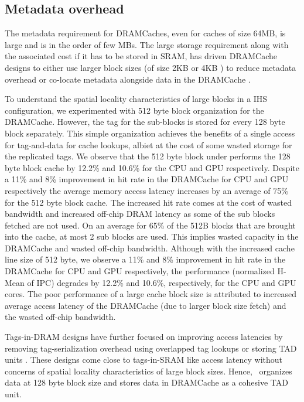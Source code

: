 \subsection{Metadata overhead} 
The metadata requirement for DRAMCaches, even for caches of size 64MB, is large and is in the order of few MBs. The large storage requirement along with the associated cost if it has to be stored in SRAM, has driven DRAMCache designs to either use larger block sizes (of size 2KB or 4KB \cite{footprint,unison-cache}) to reduce metadata overhead or co-locate metadata alongside data in the DRAMCache \cite{loh-hill,alloy,atcache}. 
\par To understand the spatial locality characteristics of large blocks in a IHS configuration, we experimented with 512 byte block organization for the DRAMCache. 
However, the tag for the sub-blocks is stored for every 128 byte block separately. This simple organization achieves the benefits of a single access for tag-and-data \cite{alloy} for cache lookups, albiet at the cost of some wasted storage for the replicated tags. We observe that the 512 byte block under performs the 128 byte block cache by 12.2\% and 10.6\% for the CPU and GPU respectively. Despite a 11\% and 8\% improvement in hit rate in the DRAMCache for CPU and GPU respectively the average memory access latency increases by an average of 75\% for the 512 byte block cache. The increased hit rate comes at the cost of wasted bandwidth and increased off-chip DRAM latency as some of the sub blocks fetched are not used. 
On an average for 65\% of the 512B blocks that are brought into the cache, at most 2 sub blocks are used.
This implies wasted capacity in the DRAMCache and wasted off-chip bandwidth.  Although with the increased cache line size of 512 byte, we observe a 11\% and 8\% improvement in hit rate in the DRAMCache for CPU and GPU respectively, the performance (normalized H-Mean of IPC) degrades by 12.2\% and 10.6\%, respectively, for the CPU and GPU cores. The poor performance of  a large cache block size is attributed to increased average access latency of the DRAMCache (due to larger block size fetch) and the wasted off-chip bandwidth.
\par Tags-in-DRAM designs have further focused on improving access latencies by removing tag-serialization overhead using overlapped tag lookups \cite{loh-hill} or storing TAD units \cite{alloy}. These designs come close to tags-in-SRAM like access latency without concerns of spatial locality characteristics of large block sizes. 
Hence, \cachename\ organizes data at 128 byte block size and stores data in DRAMCache as a cohesive TAD unit.

